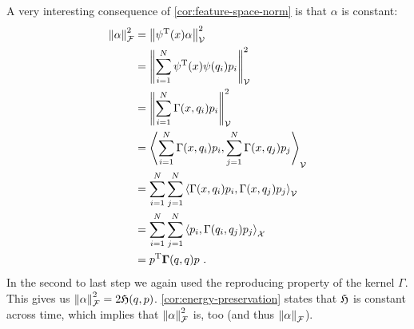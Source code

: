 A very interesting consequence of \cref{cor:feature-space-norm} is that $\alpha$ is constant:
\begin{align}
	\norm{\alpha}_{\mathcal{F}}^2 &= \norm{\psi^{\mathrm{T}}(x) \alpha}_{\mathcal{V}}^2\\
	&= \norm{\sum_{i=1}^N \psi^{\mathrm{T}}(x) \psi(q_i)p_i}_{\mathcal{V}}^2 \\
	&= \norm{\sum_{i=1}^N \Gamma(x, q_i) p_i}_{\mathcal{V}}^2\\
	&= \left<\sum_{i=1}^N\Gamma(x, q_i)p_i, \sum_{j=1}^N \Gamma(x, q_j) p_j \right>_{\mathcal{V}}\\
	&= \sum_{i=1}^N \sum_{j=1}^N \left<\Gamma(x, q_i)p_i, \Gamma(x, q_j) p_j \right>_{\mathcal{V}}\\
	&= \sum_{i=1}^N \sum_{j=1}^N \left<p_i, \Gamma(q_i, q_j) p_j\right>_{\mathcal{X}}\\
	&= p^{\mathrm{T}} \mathbf{\Gamma}(q, q) p \ .
\end{align}
In the second to last step we again used the reproducing property of the kernel $\Gamma$.
This gives us $\norm{\alpha}_{\mathcal{F}}^2 = 2 \mathfrak{H}(q, p)$.
\cref{cor:energy-preservation} states that $\mathfrak{H}$ is constant across time, which implies that $\norm{\alpha}_{\mathcal{F}}^2$ is, too (and thus  $\norm{\alpha}_{\mathcal{F}}$).
